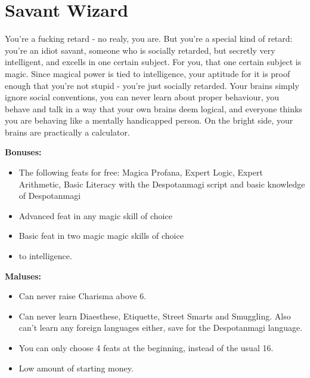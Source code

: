 \section{Savant Wizard}
You're a fucking retard - no realy, you are. But you're a special kind of retard: you're an idiot savant, someone who is socially retarded, but secretly very intelligent, and excells in one certain subject. For you, that one certain subject is magic. Since magical power is tied to intelligence, your aptitude for it is proof enough that you're not stupid - you're just socially retarded. Your brains simply ignore social conventions, you can never learn about proper behaviour, you behave and talk in a way that your own brains deem logical, and everyone thinks you are behaving like a mentally handicapped person. On the bright side, your brains are practically a calculator.

\textbf{Bonuses:}
\begin{itemize}
	\item The following feats for free: Magica Profana, Expert Logic, Expert Arithmetic, Basic Literacy with the Despotanmagi script and basic knowledge of Despotanmagi 
	\item Advanced feat in any magic skill of choice
	\item Basic feat in two magic magic skills of choice
	\item {} to intelligence.
\end{itemize}


\textbf{Maluses:}
\begin{itemize}
	\item Can never raise Charisma above 6.
	\item Can never learn Diaesthese, Etiquette, Street Smarts and Smuggling. Also can't learn any foreign languages either, save for the Despotanmagi language.
	\item You can only choose 4 feats at the beginning, instead of the usual 16.
	\item Low amount of starting money.
\end{itemize}
